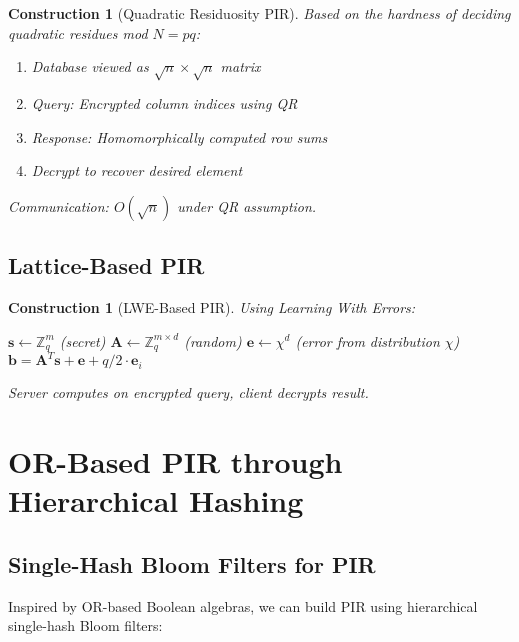 \documentclass[11pt,final]{article}
\newtheorem{construction}[theorem]{Construction}
\begin{document}
\begin{construction}[Quadratic Residuosity PIR]
Based on the hardness of deciding quadratic residues mod $N = pq$:
\begin{enumerate}
    \item Database viewed as $\sqrt{n} \times \sqrt{n}$ matrix
    \item Query: Encrypted column indices using QR
    \item Response: Homomorphically computed row sums
    \item Decrypt to recover desired element
\end{enumerate}
Communication: $O(\sqrt{n})$ under QR assumption.
\end{construction}

\subsection{Lattice-Based PIR}

\begin{construction}[LWE-Based PIR]
Using Learning With Errors:
\begin{algorithm}[H]
\caption{LWE PIR Query Generation}
$\mathbf{s} \leftarrow \mathbb{Z}_q^m$ (secret)\;
$\mathbf{A} \leftarrow \mathbb{Z}_q^{m \times d}$ (random)\;
$\mathbf{e} \leftarrow \chi^d$ (error from distribution $\chi$)\;
$\mathbf{b} = \mathbf{A}^T \mathbf{s} + \mathbf{e} + q/2 \cdot \mathbf{e}_i$\;
\end{algorithm}
Server computes on encrypted query, client decrypts result.
\end{construction}

\section{OR-Based PIR through Hierarchical Hashing}

\subsection{Single-Hash Bloom Filters for PIR}

Inspired by OR-based Boolean algebras, we can build PIR using hierarchical single-hash Bloom filters:
\end{document}

